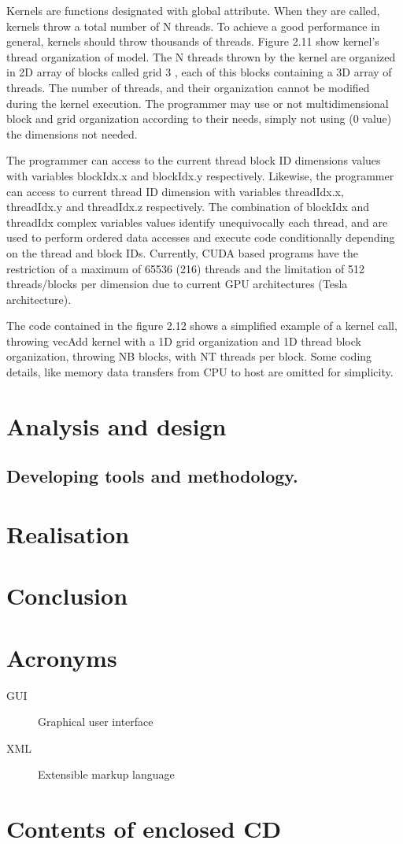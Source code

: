 \documentclass[thesis=M,english]{FITthesis}[2011/07/15]
\begin{document}
Kernels are functions designated with global attribute. When they are called, kernels throw a total number of N threads. To achieve a good performance in general, kernels should throw thousands of threads. Figure 2.11 show kernel’s thread organization of model. The N threads thrown by the kernel are organized in 2D array of blocks called grid 3 , each of this blocks containing a 3D array of threads. The number of threads, and their organization cannot be modified during the kernel execution. The programmer may use or not multidimensional block and grid organization according to their needs, simply not using (0 value) the dimensions not needed. 

The programmer can access to the current thread block ID dimensions values with variables blockIdx.x and blockIdx.y respectively. Likewise, the programmer can access to current thread ID dimension with variables threadIdx.x, threadIdx.y and threadIdx.z respectively. The combination of blockIdx and threadIdx complex variables values identify unequivocally each thread, and are used to perform ordered data accesses and execute code conditionally depending on the thread and block IDs. Currently, CUDA based programs have the restriction of a maximum of 65536 (216) threads and the limitation of 512 threads/blocks per dimension due to current GPU architectures (Tesla architecture).

The code contained in the figure 2.12 shows a simplified example of a kernel call, throwing vecAdd kernel with a 1D grid organization and 1D thread block organization, throwing NB blocks, with NT threads per block. Some coding details, like memory data transfers from CPU to host are omitted for simplicity.


\chapter{Analysis and design}

\section{Developing tools and methodology.}



\chapter{Realisation}

\chapter{Conclusion}





\appendix

\chapter{Acronyms}
\begin{description}
	\item[GUI] Graphical user interface
	\item[XML] Extensible markup language
\end{description}


\chapter{Contents of enclosed CD}
\end{document}
